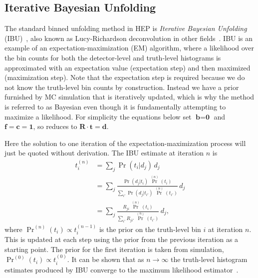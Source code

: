 \subsection{Iterative Bayesian Unfolding}
\label{sec:ibu}

The standard binned unfolding method in HEP is \textit{Iterative Bayesian Unfolding} (IBU)~\cite{DAgostini:1994fjx}, also known as Lucy-Richardson deconvolution in other fields~\cite{Lucy:1974yx, Richardson:1972}.
IBU is an example of an expectation-maximization (EM) algorithm, where a likelihood over the bin counts for both the detector-level and truth-level histograms is approximated with an expectation value (expectation step) and then maximized (maximization step).
Note that the expectation step is required because we do not know the truth-level bin counts by construction.
Instead we have a prior furnished by MC simulation that is iteratively updated, which is why the method is referred to as Bayesian even though it is fundamentally attempting to maximize a likelihood.
For simplicity the equations below set $\textbf{b}=\textbf{0}$ and $\textbf{f}=\textbf{c}=\textbf{1}$, so  reduces to $\textbf{R}\cdot\textbf{t} = \textbf{d}$.

Here the solution to one iteration of the expectation-maximization process will just be quoted without derivation.
The IBU estimate at iteration $n$ is
\begin{align}
t_i^{(n)}&=\sum_j \Pr(t_i|d_j)\, d_j \label{eq:ibu1}\\
&=\sum_j \frac{\Pr(d_j|t_i)\,\Pr^{(n)}(t_i)}{\sum_{i'} \Pr(d_j|t_{i'})\,\Pr^{(n)}(t_{i'})}\, d_j \label{eq:ibu2}\\
&=\sum_j \frac{R_{ji}\,\Pr^{(n)}(t_i)}{\sum_{i'} R_{ji'}\,\Pr^{(n)}(t_{i'})}\, d_j, \label{eq:ibu3}
\end{align}
where $\Pr^{(n)}(t_i) \propto t_i^{(n-1)}$ is the prior on the truth-level bin $i$ at iteration $n$.
This is updated at each step using the prior from the previous iteration as a starting point.
The prior for the first iteration is taken from simulation, $\Pr^{(0)}(t_i) \propto t_i^{(0)}$.
It can be shown that as $n \to \infty$ the truth-level histogram estimates produced by IBU converge to the maximum likelihood estimator~\cite{Shepp:1982}.

